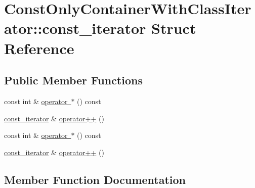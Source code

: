 \hypertarget{struct_const_only_container_with_class_iterator_1_1const__iterator}{}\section{Const\+Only\+Container\+With\+Class\+Iterator\+::const\+\_\+iterator Struct Reference}
\label{struct_const_only_container_with_class_iterator_1_1const__iterator}
\subsection*{Public Member Functions}
\begin{DoxyCompactItemize}
\item 
const int \& \mbox{\hyperlink{struct_const_only_container_with_class_iterator_1_1const__iterator_ae7072174a83f02f8ae24136d327287b1}{operator $\ast$}} () const
\item 
\mbox{\hyperlink{struct_const_only_container_with_class_iterator_1_1const__iterator}{const\+\_\+iterator}} \& \mbox{\hyperlink{struct_const_only_container_with_class_iterator_1_1const__iterator_a99150bd6377f80d9944b95aa2a5c7805}{operator++}} ()
\item 
const int \& \mbox{\hyperlink{struct_const_only_container_with_class_iterator_1_1const__iterator_ae7072174a83f02f8ae24136d327287b1}{operator $\ast$}} () const
\item 
\mbox{\hyperlink{struct_const_only_container_with_class_iterator_1_1const__iterator}{const\+\_\+iterator}} \& \mbox{\hyperlink{struct_const_only_container_with_class_iterator_1_1const__iterator_a99150bd6377f80d9944b95aa2a5c7805}{operator++}} ()
\end{DoxyCompactItemize}


\subsection{Member Function Documentation}
\mbox{\label{struct_const_only_container_with_class_iterator_1_1const__iterator_ae7072174a83f02f8ae24136d327287b1}} 
